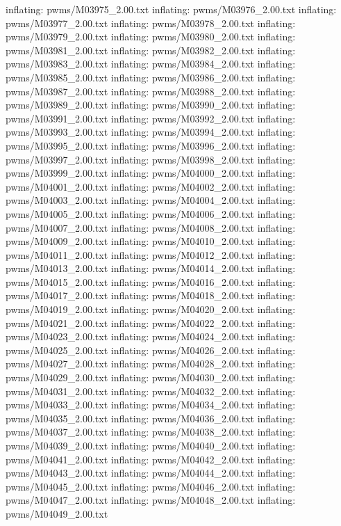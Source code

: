 \documentclass[letterpaper,10pt,english]{sphinxmanual}
\begin{document}
{\begin{sphinxVerbatim}[commandchars=\\\{\}]
  inflating: pwms/M03975\_2.00.txt
  inflating: pwms/M03976\_2.00.txt
  inflating: pwms/M03977\_2.00.txt
  inflating: pwms/M03978\_2.00.txt
  inflating: pwms/M03979\_2.00.txt
  inflating: pwms/M03980\_2.00.txt
  inflating: pwms/M03981\_2.00.txt
  inflating: pwms/M03982\_2.00.txt
  inflating: pwms/M03983\_2.00.txt
  inflating: pwms/M03984\_2.00.txt
  inflating: pwms/M03985\_2.00.txt
  inflating: pwms/M03986\_2.00.txt
  inflating: pwms/M03987\_2.00.txt
  inflating: pwms/M03988\_2.00.txt
  inflating: pwms/M03989\_2.00.txt
  inflating: pwms/M03990\_2.00.txt
  inflating: pwms/M03991\_2.00.txt
  inflating: pwms/M03992\_2.00.txt
  inflating: pwms/M03993\_2.00.txt
  inflating: pwms/M03994\_2.00.txt
  inflating: pwms/M03995\_2.00.txt
  inflating: pwms/M03996\_2.00.txt
  inflating: pwms/M03997\_2.00.txt
  inflating: pwms/M03998\_2.00.txt
  inflating: pwms/M03999\_2.00.txt
  inflating: pwms/M04000\_2.00.txt
  inflating: pwms/M04001\_2.00.txt
  inflating: pwms/M04002\_2.00.txt
  inflating: pwms/M04003\_2.00.txt
  inflating: pwms/M04004\_2.00.txt
  inflating: pwms/M04005\_2.00.txt
  inflating: pwms/M04006\_2.00.txt
  inflating: pwms/M04007\_2.00.txt
  inflating: pwms/M04008\_2.00.txt
  inflating: pwms/M04009\_2.00.txt
  inflating: pwms/M04010\_2.00.txt
  inflating: pwms/M04011\_2.00.txt
  inflating: pwms/M04012\_2.00.txt
  inflating: pwms/M04013\_2.00.txt
  inflating: pwms/M04014\_2.00.txt
  inflating: pwms/M04015\_2.00.txt
  inflating: pwms/M04016\_2.00.txt
  inflating: pwms/M04017\_2.00.txt
  inflating: pwms/M04018\_2.00.txt
  inflating: pwms/M04019\_2.00.txt
  inflating: pwms/M04020\_2.00.txt
  inflating: pwms/M04021\_2.00.txt
  inflating: pwms/M04022\_2.00.txt
  inflating: pwms/M04023\_2.00.txt
  inflating: pwms/M04024\_2.00.txt
  inflating: pwms/M04025\_2.00.txt
  inflating: pwms/M04026\_2.00.txt
  inflating: pwms/M04027\_2.00.txt
  inflating: pwms/M04028\_2.00.txt
  inflating: pwms/M04029\_2.00.txt
  inflating: pwms/M04030\_2.00.txt
  inflating: pwms/M04031\_2.00.txt
  inflating: pwms/M04032\_2.00.txt
  inflating: pwms/M04033\_2.00.txt
  inflating: pwms/M04034\_2.00.txt
  inflating: pwms/M04035\_2.00.txt
  inflating: pwms/M04036\_2.00.txt
  inflating: pwms/M04037\_2.00.txt
  inflating: pwms/M04038\_2.00.txt
  inflating: pwms/M04039\_2.00.txt
  inflating: pwms/M04040\_2.00.txt
  inflating: pwms/M04041\_2.00.txt
  inflating: pwms/M04042\_2.00.txt
  inflating: pwms/M04043\_2.00.txt
  inflating: pwms/M04044\_2.00.txt
  inflating: pwms/M04045\_2.00.txt
  inflating: pwms/M04046\_2.00.txt
  inflating: pwms/M04047\_2.00.txt
  inflating: pwms/M04048\_2.00.txt
  inflating: pwms/M04049\_2.00.txt

\end{sphinxVerbatim}}
\end{document}
